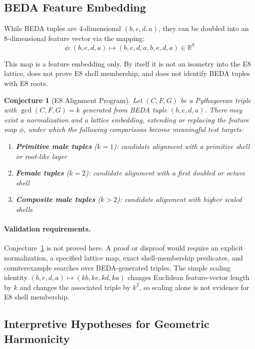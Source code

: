 \documentclass[12pt]{article}
\newtheorem{conjecture}[theorem]{Conjecture}
\begin{document}
\subsection{BEDA Feature Embedding}

While BEDA tuples are 4-dimensional $(b, e, d, a)$, they can be doubled into an 8-dimensional feature vector via the mapping:
\begin{equation}
\phi: (b, e, d, a) \mapsto (b, e, d, a, b, e, d, a) \in \mathbb{R}^8
\end{equation}

This map is a feature embedding only. By itself it is not an isometry into the E8 lattice, does not prove E8 shell membership, and does not identify BEDA tuples with E8 roots.

\begin{conjecture}[E8 Alignment Program]\label{conj:e8}
Let $(C, F, G)$ be a Pythagorean triple with $\gcd(C, F, G) = k$ generated from BEDA tuple $(b, e, d, a)$. There may exist a normalization and a lattice embedding, extending or replacing the feature map $\phi$, under which the following comparisons become meaningful test targets:

\begin{enumerate}
\item \textbf{Primitive male tuples} ($k=1$): candidate alignment with a primitive shell or root-like layer
\item \textbf{Female tuples} ($k=2$): candidate alignment with a first doubled or octave shell
\item \textbf{Composite male tuples} ($k>2$): candidate alignment with higher scaled shells
\end{enumerate}
\end{conjecture}

\paragraph{Validation requirements.}
Conjecture~\ref{conj:e8} is not proved here. A proof or disproof would require an explicit normalization, a specified lattice map, exact shell-membership predicates, and counterexample searches over BEDA-generated triples. The simple scaling identity $(b,e,d,a) \mapsto (kb,ke,kd,ka)$ changes Euclidean feature-vector length by $k$ and changes the associated triple by $k^2$, so scaling alone is not evidence for E8 shell membership.

\subsection{Interpretive Hypotheses for Geometric Harmonicity}
\end{document}
